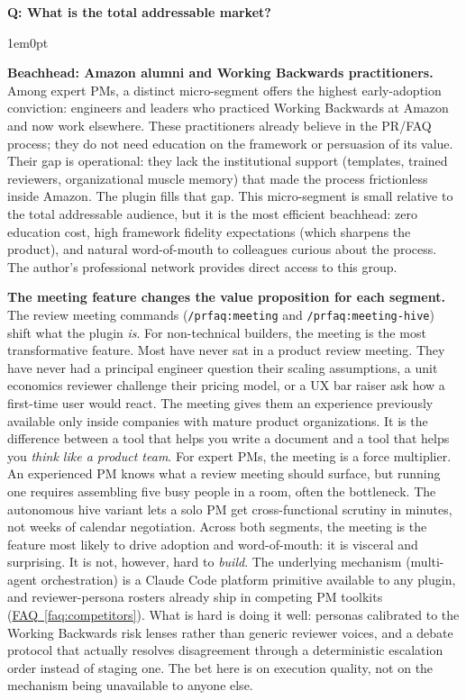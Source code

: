 \documentclass[11pt,letterpaper]{article}
\newcounter{faqnum}
\newenvironment{faqpair}[1]{%
  \needspace{4\baselineskip}%
  \vspace{0.5em}%
  \refstepcounter{faqnum}%
  \noindent\textbf{\color{SectionBlue}Q\thefaqnum: #1}\par\nopagebreak[4]%
  \vspace{0.2em}%
  \begin{adjustwidth}{1em}{0pt}%
  \setlength{\parindent}{0pt}%
}{%
  \end{adjustwidth}%
  \vspace{0.5em}%
}
\newcommand{\faqref}[1]{\hyperref[#1]{FAQ~\ref*{#1}}}
\begin{document}
\begin{faqpair}{What is the total addressable market?}
  \textbf{Beachhead: Amazon alumni and Working Backwards practitioners.} Among expert PMs, a distinct micro-segment offers the highest early-adoption conviction: engineers and leaders who practiced Working Backwards at Amazon and now work elsewhere. These practitioners already believe in the PR/FAQ process; they do not need education on the framework or persuasion of its value. Their gap is operational: they lack the institutional support (templates, trained reviewers, organizational muscle memory) that made the process frictionless inside Amazon. The plugin fills that gap. This micro-segment is small relative to the total addressable audience, but it is the most efficient beachhead: zero education cost, high framework fidelity expectations (which sharpens the product), and natural word-of-mouth to colleagues curious about the process. The author's professional network provides direct access to this group.

  \textbf{The meeting feature changes the value proposition for each segment.} The review meeting commands (\texttt{/prfaq:meeting} and \texttt{/prfaq:meeting-hive}) shift what the plugin \textit{is}. For non-technical builders, the meeting is the most transformative feature. Most have never sat in a product review meeting. They have never had a principal engineer question their scaling assumptions, a unit economics reviewer challenge their pricing model, or a UX bar raiser ask how a first-time user would react. The meeting gives them an experience previously available only inside companies with mature product organizations. It is the difference between a tool that helps you write a document and a tool that helps you \textit{think like a product team}. For expert PMs, the meeting is a force multiplier. An experienced PM knows what a review meeting should surface, but running one requires assembling five busy people in a room, often the bottleneck. The autonomous hive variant lets a solo PM get cross-functional scrutiny in minutes, not weeks of calendar negotiation. Across both segments, the meeting is the feature most likely to drive adoption and word-of-mouth: it is visceral and surprising. It is not, however, hard to \textit{build}. The underlying mechanism (multi-agent orchestration) is a Claude Code platform primitive available to any plugin, and reviewer-persona rosters already ship in competing PM toolkits (\faqref{faq:competitors}). What is hard is doing it well: personas calibrated to the Working Backwards risk lenses rather than generic reviewer voices, and a debate protocol that actually resolves disagreement through a deterministic escalation order instead of staging one. The bet here is on execution quality, not on the mechanism being unavailable to anyone else.


\end{faqpair}
\end{document}
